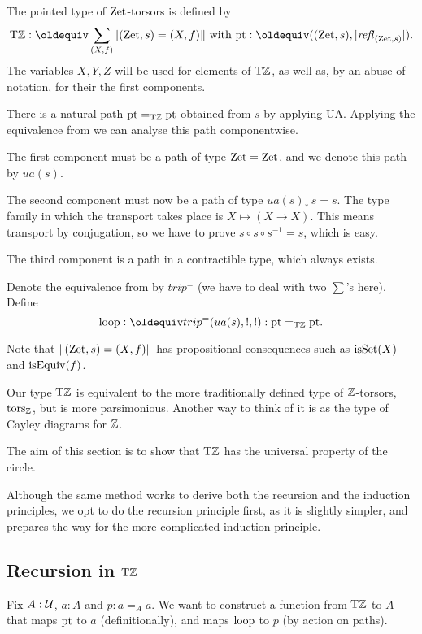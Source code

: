 \documentclass[a4,12pt]{amsart}
\begin{document}
\begin{definition}\label{sec:ZTors}
The pointed type of $\mathrm{Zet}$-torsors is defined by
\[
\TorZ\defeq \sum_{(X,f)}\Trunc{(\zet,s)=(X,f)} \text{~with~}
\pt\defeq ((\zet,s),\trunc{\refl{(\zet,s)}}).
\]
The variables $X,Y,Z$ will be used for elements of ${\mathrm{T}\mathbb{Z}}$, 
as well as, by an abuse of notation, for their the first components.

There is a natural path ${\mathord{\mathrm{pt}}} =_{\mathrm{T}\mathbb{Z}} {\mathord{\mathrm{pt}}}$ obtained from $s$
by applying UA.
Applying the equivalence from \cite[Theorem 2.7.2]{hottbook} 
we can analyse this path componentwise. 

The first component must be a path of type $\mathrm{Zet}=\mathrm{Zet}$,
and we denote this path by $ua(s)$. 

The second component must now be
a path of type $ua(s)_*\, s = s$. The type family in which the transport
takes place is $X\mapsto (X\to X)$. This means transport by conjugation,
so we have to prove $s\circ s \circ s^{-1} = s$, which is easy.

The third component is a path in a contractible type, which always exists.

Denote the equivalence from \cite[Theorem 2.7.2]{hottbook}
by $trip^=$ (we have to deal with two $\sum$'s here). Define
\[
\Zloop \defeq trip^= (ua(s),!,!): \pt =_\TorZ \pt.
\]
\end{definition}
Note that $\lVert(\mathrm{Zet},s)=(X,f)\rVert$ has propositional consequences
such as $\mathrm{isSet}(X)$ and $\mathrm{isEquiv}(f)$.

Our type ${\mathrm{T}\mathbb{Z}}$ is equivalent to the more traditionally defined 
type of $\mathbb{Z}$-torsors, $\mathrm{tors}_{\mathbb{Z}}$, but is more parsimonious.
Another way to think of it is as the type of Cayley diagrams for $\mathbb{Z}$.

The aim of this section is to show that ${\mathrm{T}\mathbb{Z}}$ has the
universal property of the circle.

Although the same method works to derive both the recursion and the induction principles,
we opt to do the recursion principle first,
as it is slightly simpler,
and prepares the way for the more complicated induction principle.


\subsection{Recursion in ${\mathrm{T}\mathbb{Z}}$}\label{sec:TorZ-recursion}

Fix $A:\mathcal{U}$, $a:A$ and $p: a=_A a$.
We want to construct a function from ${\mathrm{T}\mathbb{Z}}$ to $A$ 
that maps ${\mathord{\mathrm{pt}}}$ to $a$ (definitionally),
and maps $\mathrm{loop}$ to $p$ (by action on paths).
\end{document}
